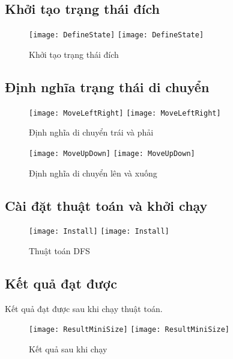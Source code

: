 \subsection{Khởi tạo trạng thái đích}
\begin{figure}[!htbp]
  \begin{center}
    \leavevmode
    \ifpdf
      \texttt{[image: DefineState]}
    \else
      \texttt{[image: DefineState]}
    \fi
    \caption{Khởi tạo trạng thái đích}
    \label{FigAir}
   
  \end{center}
\end{figure}
\FloatBarrier
\subsection{Định nghĩa trạng thái di chuyển}
\begin{figure}
  \begin{center}
 \leavevmode
    \ifpdf
      \texttt{[image: MoveLeftRight]}
    \else
      \texttt{[image: MoveLeftRight]}
    \fi
    \caption{Định nghĩa di chuyển trái và phải}
    \label{FigAir}
 \end{center}
\end{figure}
\FloatBarrier

\begin{figure}
  \begin{center}
    \leavevmode
    \ifpdf
      \texttt{[image: MoveUpDown]}
    \else
      \texttt{[image: MoveUpDown]}
    \fi
    \caption{Định nghĩa di chuyển lên và xuống}
    \label{FigAir}
  \end{center}
\end{figure}
\FloatBarrier
\subsection{Cài đặt thuật toán và khởi chạy}
\begin{figure}[!htbp]
\begin{center}
    \leavevmode
    \ifpdf
      \texttt{[image: Install]}
    \else
      \texttt{[image: Install]}
    \fi
    \caption{Thuật toán DFS}
    \label{FigAir}
  \end{center}
\end{figure}
\FloatBarrier
\subsection{Kết quả đạt được}
Kết quả đạt được sau khi chạy thuật toán.\\
\begin{figure}[!htbp]
\begin{center}
    \leavevmode
    \ifpdf
      \texttt{[image: ResultMiniSize]}
    \else
      \texttt{[image: ResultMiniSize]}
    \fi
    \caption{Kết quả sau khi chạy}
    \label{FigAir}
  \end{center}
\end{figure}
\FloatBarrier


